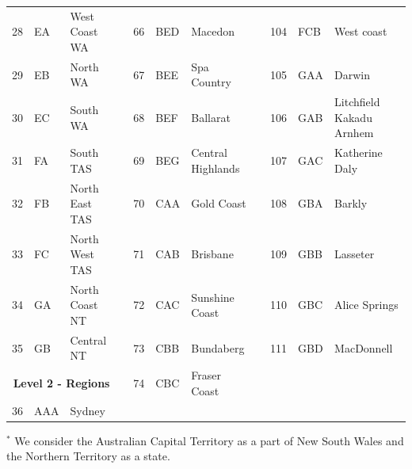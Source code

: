 \documentclass[12pt]{article}
\theoremstyle{definition}
\begin{document}
\begin{table}[!hb]
{\begin{tabular}{lllllllllll}
			28	& EA & West Coast WA 	& &  66  & BED & Macedon    &&104 & FCB& West coast\\
			29	& EB & North WA			& &  67  & BEE & Spa Country   &&105 & GAA& Darwin \\
			30	& EC & South WA 		& &   68  & BEF & Ballarat     &&106 & GAB& Litchfield Kakadu Arnhem\\
			31	& FA & South TAS		& &  69  & BEG & Central Highlands  &&107 & GAC& Katherine Daly\\
			32	& FB & North East TAS	& & 70  & CAA & Gold Coast  &&108 & GBA& Barkly\\
			33	& FC & North West TAS	& & 71  & CAB & Brisbane  &&109 & GBB& Lasseter\\
			34	& GA & North Coast NT	& & 72  & CAC & Sunshine Coast &&110 & GBC& Alice Springs\\
			35	& GB & Central NT		& &  73  & CBB & Bundaberg      &&111 & GBD& MacDonnell\\
			\cmidrule(lr){1-3}
			\multicolumn{3}{c}{\textbf{Level 2 - Regions}} & & 74  & CBC & Fraser Coast    &&\\
			\cmidrule(lr){1-3}
			36	& AAA & Sydney 			& 	&  &&\\
			
			\bottomrule
		\end{tabular}
	}
\fontsize{8}{9}\selectfont
$^*$ We consider the Australian Capital Territory as a part of New South Wales and the Northern Territory as a state.
\end{table}
\end{document}
